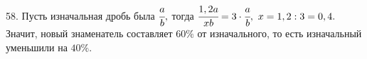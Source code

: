 58. Пусть изначальная дробь была $\cfrac{a}{b},$ тогда $\cfrac{1,2a}{xb}=3\cdot \cfrac{a}{b},\ x=1,2:3=0,4.$ Значит, новый знаменатель составляет $60\%$ от изначального, то есть изначальный уменьшили на $40\%.$\\

